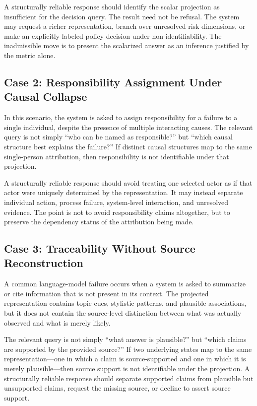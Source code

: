 \documentclass[11pt]{article}
\theoremstyle{definition}
\theoremstyle{remark}
\begin{document}
A structurally reliable response should identify the scalar projection as insufficient for the decision query. The result need not be refusal. The system may request a richer representation, branch over unresolved risk dimensions, or make an explicitly labeled policy decision under non-identifiability. The inadmissible move is to present the scalarized answer as an inference justified by the metric alone.

\subsection{Case 2: Responsibility Assignment Under Causal Collapse}

In this scenario, the system is asked to assign responsibility for a failure to a single individual, despite the presence of multiple interacting causes. The relevant query is not simply ``who can be named as responsible?'' but ``which causal structure best explains the failure?'' If distinct causal structures map to the same single-person attribution, then responsibility is not identifiable under that projection.

A structurally reliable response should avoid treating one selected actor as if that actor were uniquely determined by the representation. It may instead separate individual action, process failure, system-level interaction, and unresolved evidence. The point is not to avoid responsibility claims altogether, but to preserve the dependency status of the attribution being made.

\subsection{Case 3: Traceability Without Source Reconstruction}

A common language-model failure occurs when a system is asked to summarize or cite information that is not present in its context. The projected representation contains topic cues, stylistic patterns, and plausible associations, but it does not contain the source-level distinction between what was actually observed and what is merely likely.

The relevant query is not simply ``what answer is plausible?'' but ``which claims are supported by the provided source?'' If two underlying states map to the same representation---one in which a claim is source-supported and one in which it is merely plausible---then source support is not identifiable under the projection. A structurally reliable response should separate supported claims from plausible but unsupported claims, request the missing source, or decline to assert source support.
\end{document}
